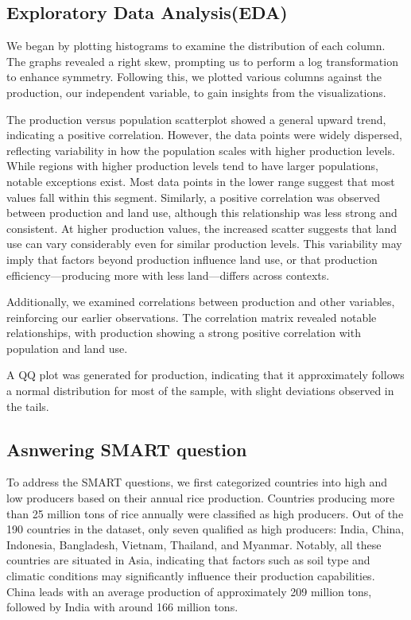 \documentclass[
  man]{apa6}
\begin{document}
\subsection{Exploratory Data Analysis(EDA)}\label{exploratory-data-analysiseda}

We began by plotting histograms to examine the distribution of each column. The graphs revealed a right skew, prompting us to perform a log transformation to enhance symmetry. Following this, we plotted various columns against the production, our independent variable, to gain insights from the visualizations.

The production versus population scatterplot showed a general upward trend, indicating a positive correlation. However, the data points were widely dispersed, reflecting variability in how the population scales with higher production levels. While regions with higher production levels tend to have larger populations, notable exceptions exist. Most data points in the lower range suggest that most values fall within this segment. Similarly, a positive correlation was observed between production and land use, although this relationship was less strong and consistent. At higher production values, the increased scatter suggests that land use can vary considerably even for similar production levels. This variability may imply that factors beyond production influence land use, or that production efficiency---producing more with less land---differs across contexts.

Additionally, we examined correlations between production and other variables, reinforcing our earlier observations. The correlation matrix revealed notable relationships, with production showing a strong positive correlation with population and land use.

A QQ plot was generated for production, indicating that it approximately follows a normal distribution for most of the sample, with slight deviations observed in the tails.

\subsection{Asnwering SMART question}\label{asnwering-smart-question}

To address the SMART questions, we first categorized countries into high and low producers based on their annual rice production. Countries producing more than 25 million tons of rice annually were classified as high producers. Out of the 190 countries in the dataset, only seven qualified as high producers: India, China, Indonesia, Bangladesh, Vietnam, Thailand, and Myanmar. Notably, all these countries are situated in Asia, indicating that factors such as soil type and climatic conditions may significantly influence their production capabilities. China leads with an average production of approximately 209 million tons, followed by India with around 166 million tons.
\end{document}
